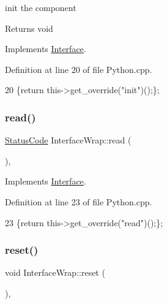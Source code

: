 init the component

\begin{DoxyReturn}{Returns}
void 
\end{DoxyReturn}


Implements \hyperlink{classInterface_a1d095c113b1e89d1f5f68323856fee63}{Interface}.



Definition at line 20 of file Python.\+cpp.


\begin{DoxyCode}
20 \{\textcolor{keywordflow}{return} this->get\_override(\textcolor{stringliteral}{"init"})();\};
\end{DoxyCode}
\mbox{\label{structInterfaceWrap_a4dd40213e6d37c73521450aa0c7a8f4d}} 
\subsubsection{\texorpdfstring{read()}{read()}}
{\footnotesize\ttfamily \hyperlink{classStatusCode}{Status\+Code} Interface\+Wrap\+::read (\begin{DoxyParamCaption}\item[{\hyperlink{classIOdata}{I\+Odata} $\ast$}]{ }\end{DoxyParamCaption})\hspace{0.3cm}{\ttfamily [inline]}, {\ttfamily [virtual]}}



Implements \hyperlink{classInterface_a99136b67c8e6cbcaa0477c36940ac2ef}{Interface}.



Definition at line 23 of file Python.\+cpp.


\begin{DoxyCode}
23 \{\textcolor{keywordflow}{return} this->get\_override(\textcolor{stringliteral}{"read"})();\};
\end{DoxyCode}
\mbox{\label{structInterfaceWrap_a6c350b2f44c579187e6e4269cae29bae}} 
\subsubsection{\texorpdfstring{reset()}{reset()}}
{\footnotesize\ttfamily void Interface\+Wrap\+::reset (\begin{DoxyParamCaption}{ }\end{DoxyParamCaption})\hspace{0.3cm}{\ttfamily [inline]}, {\ttfamily [virtual]}}

